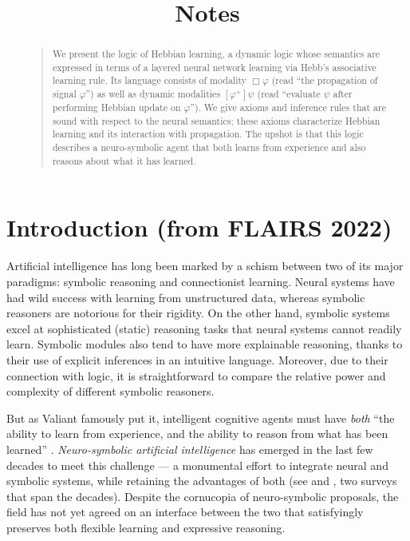 \documentclass[12pt]{article}
\theoremstyle{definition}
\begin{document}
\title{Notes}
\maketitle
\renewcommand*\contentsname{\textcolor{myblue}{Jump to Section}}
\tableofcontents
\singlespacing

\section{\textcolor{myblue}{Introduction (from FLAIRS 2022)}}

\begin{abstract}
\begin{quote}
We present the logic of Hebbian learning, a dynamic logic whose semantics are expressed in terms of a layered neural network learning via Hebb's associative learning rule.  Its language consists of modality $\Box \varphi$ (read ``the propagation of signal $\varphi$'') as well as dynamic modalities $[\varphi^+] \psi$ (read ``evaluate $\psi$ after performing Hebbian update on $\varphi$'').  We give axioms and inference rules that are sound with respect to the neural semantics; these axioms characterize Hebbian learning and its interaction with propagation.  The upshot is that this logic describes a neuro-symbolic agent that both learns from experience and also reasons about what it has learned.
\end{quote}
\end{abstract}

Artificial intelligence  has  long  been  marked  by  a  schism between two of its major paradigms: symbolic reasoning and connectionist learning.  Neural systems have had wild success with learning from unstructured data, whereas symbolic reasoners are notorious for their rigidity.  On the other hand, symbolic systems excel at sophisticated (static) reasoning tasks that neural systems cannot readily learn.  Symbolic modules also tend to have more explainable reasoning, thanks to their use of explicit inferences in an intuitive language.  Moreover, due to their connection with logic, it is straightforward to compare the relative power and complexity of different symbolic reasoners.

But as Valiant famously put it, intelligent cognitive agents must have \emph{both} ``the ability to learn from experience, and the ability to reason from what has been learned'' \cite{valiant2003three}.  \emph{Neuro-symbolic artificial intelligence} has emerged in the last few decades to meet this challenge --- a monumental effort to integrate neural and symbolic systems, while retaining the advantages of both (see \cite{bader2005dimensions} and \cite{sarker2021neuro}, two surveys that span the decades).  Despite the cornucopia of neuro-symbolic proposals, the field has not yet agreed on an interface between the two that satisfyingly preserves both flexible learning and expressive reasoning.
\end{document}
